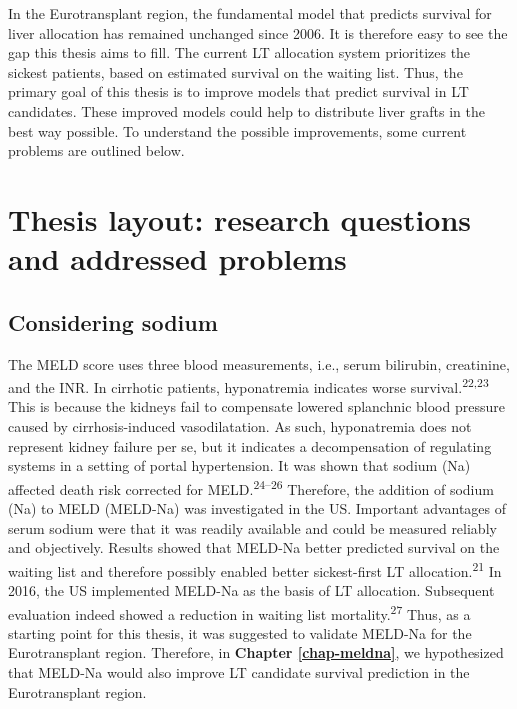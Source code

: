 \documentclass[11pt,english,]{book} %
\begin{document}
In the Eurotransplant region, the fundamental model that predicts survival for liver allocation has remained unchanged since 2006. It is therefore easy to see the gap this thesis aims to fill. The current LT allocation system prioritizes the sickest patients, based on estimated survival on the waiting list. Thus, the primary goal of this thesis is to improve models that predict survival in LT candidates. These improved models could help to distribute liver grafts in the best way possible. To understand the possible improvements, some current problems are outlined below.

\hypertarget{thesis-layout-research-questions-and-addressed-problems}{%
\section*{Thesis layout: research questions and addressed problems}\label{thesis-layout-research-questions-and-addressed-problems}}

\hypertarget{considering-sodium}{%
\subsection*{Considering sodium}\label{considering-sodium}}

The MELD score uses three blood measurements, i.e., serum bilirubin, creatinine, and the INR. In cirrhotic patients, hyponatremia indicates worse survival.\textsuperscript{22,23} This is because the kidneys fail to compensate lowered splanchnic blood pressure caused by cirrhosis-induced vasodilatation. As such, hyponatremia does not represent kidney failure per se, but it indicates a decompensation of regulating systems in a setting of portal hypertension. It was shown that sodium (Na) affected death risk corrected for MELD.\textsuperscript{24--26} Therefore, the addition of sodium (Na) to MELD (MELD-Na) was investigated in the US. Important advantages of serum sodium were that it was readily available and could be measured reliably and objectively. Results showed that MELD-Na better predicted survival on the waiting list and therefore possibly enabled better sickest-first LT allocation.\textsuperscript{21} In 2016, the US implemented MELD-Na as the basis of LT allocation. Subsequent evaluation indeed showed a reduction in waiting list mortality.\textsuperscript{27} Thus, as a starting point for this thesis, it was suggested to validate MELD-Na for the Eurotransplant region. Therefore, in \textbf{Chapter \ref{chap-meldna}}, we hypothesized that MELD-Na would also improve LT candidate survival prediction in the Eurotransplant region.
\end{document}
